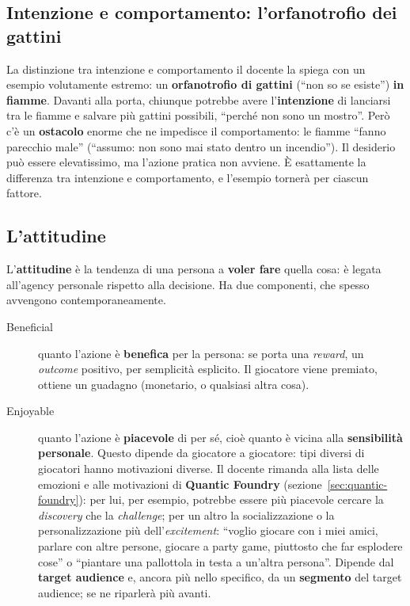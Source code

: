 \subsection{Intenzione e comportamento: l'orfanotrofio dei gattini}

La distinzione tra intenzione e comportamento il docente la spiega con un
esempio volutamente estremo: un \textbf{orfanotrofio di gattini} (``non so
se esiste'') \textbf{in fiamme}. Davanti alla porta, chiunque potrebbe avere
l'\textbf{intenzione} di lanciarsi tra le fiamme e salvare più gattini
possibili, ``perché non sono un mostro''. Però c'è un \textbf{ostacolo}
enorme che ne impedisce il comportamento: le fiamme ``fanno parecchio male''
(``assumo: non sono mai stato dentro un incendio''). Il desiderio può essere
elevatissimo, ma l'azione pratica non avviene. È esattamente la differenza
tra intenzione e comportamento, e l'esempio tornerà per ciascun fattore.

\subsection{L'attitudine}

L'\textbf{attitudine} è la tendenza di una persona a \textbf{voler fare}
quella cosa: è legata all'agency personale rispetto alla decisione. Ha due
componenti, che spesso avvengono contemporaneamente.
\begin{description}
  \item[Beneficial] quanto l'azione è \textbf{benefica} per la persona: se
        porta una \emph{reward}, un \emph{outcome} positivo, per semplicità
        esplicito. Il giocatore viene premiato, ottiene un guadagno
        (monetario, o qualsiasi altra cosa).
  \item[Enjoyable] quanto l'azione è \textbf{piacevole} di per sé, cioè
        quanto è vicina alla \textbf{sensibilità personale}. Questo dipende
        da giocatore a giocatore: tipi diversi di giocatori hanno
        motivazioni diverse. Il docente rimanda alla lista delle emozioni e
        alle motivazioni di \textbf{Quantic Foundry}
        (sezione~\ref{sec:quantic-foundry}): per lui, per esempio, potrebbe
        essere più piacevole cercare la \emph{discovery} che la
        \emph{challenge}; per un altro la socializzazione o la
        personalizzazione più dell'\emph{excitement}: ``voglio giocare con i
        miei amici, parlare con altre persone, giocare a party game,
        piuttosto che far esplodere cose'' o ``piantare una pallottola in
        testa a un'altra persona''. Dipende dal \textbf{target audience} e,
        ancora più nello specifico, da un \textbf{segmento} del target
        audience; se ne riparlerà più avanti.
\end{description}

